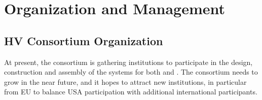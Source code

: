 \section{Organization and Management}
\label{sec:fddp-hv-org}

\subsection{HV Consortium Organization}
\label{sec:fddp-hv-org-consortium}

At present, the  consortium is gathering %
institutions to participate in the design, construction and assembly of the  systems for both  and . %
The consortium needs to grow in the near future, and it hopes to attract new  institutions, in particular from EU to balance USA participation with additional international participants.

